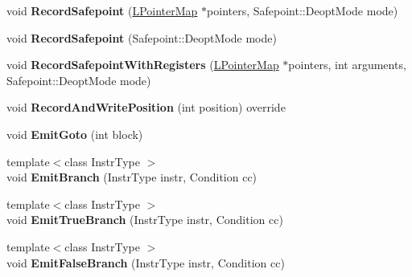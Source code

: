 \begin{DoxyCompactItemize}
\item 
void {\bfseries Record\+Safepoint} (\hyperlink{classv8_1_1internal_1_1_l_pointer_map}{L\+Pointer\+Map} $\ast$pointers, Safepoint\+::\+Deopt\+Mode mode)\hypertarget{classv8_1_1internal_1_1_l_code_gen_a7f742e0bc068c384673a3490e15b230c}{}\label{classv8_1_1internal_1_1_l_code_gen_a7f742e0bc068c384673a3490e15b230c}

\item 
void {\bfseries Record\+Safepoint} (Safepoint\+::\+Deopt\+Mode mode)\hypertarget{classv8_1_1internal_1_1_l_code_gen_a3621dccea782082b57057f617a9dd24a}{}\label{classv8_1_1internal_1_1_l_code_gen_a3621dccea782082b57057f617a9dd24a}

\item 
void {\bfseries Record\+Safepoint\+With\+Registers} (\hyperlink{classv8_1_1internal_1_1_l_pointer_map}{L\+Pointer\+Map} $\ast$pointers, int arguments, Safepoint\+::\+Deopt\+Mode mode)\hypertarget{classv8_1_1internal_1_1_l_code_gen_a15c074803ff1d0270234efb3e8830c75}{}\label{classv8_1_1internal_1_1_l_code_gen_a15c074803ff1d0270234efb3e8830c75}

\item 
void {\bfseries Record\+And\+Write\+Position} (int position) override\hypertarget{classv8_1_1internal_1_1_l_code_gen_a7f2c2fb5fe21ed4f96fa43839a3c459d}{}\label{classv8_1_1internal_1_1_l_code_gen_a7f2c2fb5fe21ed4f96fa43839a3c459d}

\item 
void {\bfseries Emit\+Goto} (int block)\hypertarget{classv8_1_1internal_1_1_l_code_gen_a77ef06fc94dce505c88f628d129c114d}{}\label{classv8_1_1internal_1_1_l_code_gen_a77ef06fc94dce505c88f628d129c114d}

\item 
{\footnotesize template$<$class Instr\+Type $>$ }\\void {\bfseries Emit\+Branch} (Instr\+Type instr, Condition cc)\hypertarget{classv8_1_1internal_1_1_l_code_gen_a1f6bfaf873f88f28eced1930c1974403}{}\label{classv8_1_1internal_1_1_l_code_gen_a1f6bfaf873f88f28eced1930c1974403}

\item 
{\footnotesize template$<$class Instr\+Type $>$ }\\void {\bfseries Emit\+True\+Branch} (Instr\+Type instr, Condition cc)\hypertarget{classv8_1_1internal_1_1_l_code_gen_af0b023b0c5bfdac97e10cf47560adf62}{}\label{classv8_1_1internal_1_1_l_code_gen_af0b023b0c5bfdac97e10cf47560adf62}

\item 
{\footnotesize template$<$class Instr\+Type $>$ }\\void {\bfseries Emit\+False\+Branch} (Instr\+Type instr, Condition cc)\hypertarget{classv8_1_1internal_1_1_l_code_gen_a24f4472aa51899a74a69b6280585d3b6}{}\label{classv8_1_1internal_1_1_l_code_gen_a24f4472aa51899a74a69b6280585d3b6}


\end{DoxyCompactItemize}

